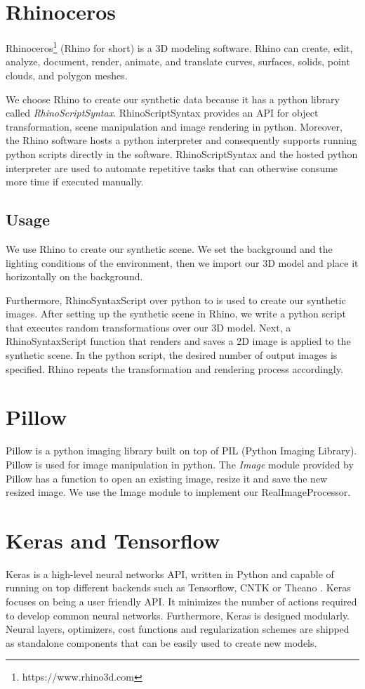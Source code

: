 \section{Rhinoceros}\label{sec:rhino}
Rhinoceros\footnote{https://www.rhino3d.com} (Rhino for short) is a 3D modeling software. Rhino can create, edit, analyze, document, render, animate, and translate curves, surfaces, solids, point clouds, and polygon meshes.

We choose Rhino to create our synthetic data because it has a python library called \textit{RhinoScriptSyntax}. RhinoScriptSyntax provides an API for object transformation, scene manipulation and image rendering in python. Moreover, the Rhino software hosts a python interpreter and consequently supports running python scripts directly in the software. RhinoScriptSyntax and the hosted python interpreter are used to automate repetitive tasks that can otherwise consume more time if executed manually.

\subsection{Usage}
We use Rhino to create our synthetic scene. We set the background and the lighting conditions of the environment, then we import our 3D model and place it horizontally on the background.

Furthermore, RhinoSyntaxScript over python to is used to create our synthetic images. After setting up the synthetic scene in Rhino, we write a python script that executes random transformations over our 3D model. Next, a RhinoSyntaxScript function that renders and saves a 2D image is applied to the synthetic scene. In the python script, the desired number of output images is specified. Rhino repeats the transformation and rendering process accordingly.


\section{Pillow}\label{sec:pillow}
Pillow is a python imaging library built on top of PIL (Python Imaging Library). Pillow is used for image manipulation in python. The \textit{Image} module provided by Pillow has a function to open an existing image, resize it and save the new resized image. We use the Image module to implement our RealImageProcessor.


\section{Keras and Tensorflow}\label{sec:keras}
Keras is a high-level neural networks API, written in Python and capable of running on top different backends such as Tensorflow, CNTK or Theano \cite{chollet2015keras}. Keras focuses on being a user friendly API. It minimizes the number of actions required to develop common neural networks. Furthermore, Keras is designed modularly. Neural layers, optimizers, cost functions and regularization schemes are shipped as standalone components that can be easily used to create new models.

